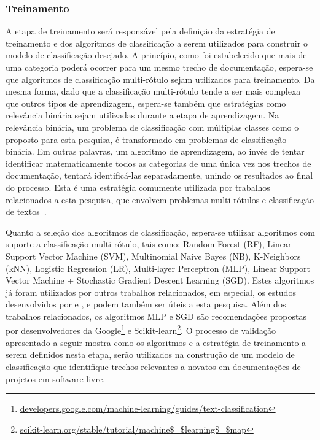 \subsubsection{Treinamento}
A etapa de treinamento será responsável pela definição da estratégia de treinamento e dos algoritmos de classificação a serem utilizados para construir o modelo de classificação desejado. A princípio, como foi estabelecido que mais de uma categoria poderá ocorrer para um mesmo trecho de documentação, espera-se que algoritmos de classificação multi-rótulo sejam utilizados para treinamento. Da mesma forma, dado que a classificação multi-rótulo tende a ser mais complexa que outros tipos de aprendizagem, espera-se também que estratégias como relevância binária sejam utilizadas durante a etapa de aprendizagem. Na relevância binária, um problema de classificação com múltiplas classes como o proposto para esta pesquisa, é transformado em problemas de classificação binária. Em outras palavras, um algoritmo de aprendizagem, ao invés de tentar identificar matematicamente todos as categorias de uma única vez nos trechos de documentação, tentará identificá-las separadamente, unindo os resultados ao final do processo. Esta é uma estratégia comumente utilizada por trabalhos relacionados a esta pesquisa, que envolvem problemas multi-rótulos e classificação de textos~\citep{panichella2015supporting}. 

Quanto a seleção dos algoritmos de classificação, espera-se utilizar algoritmos com suporte a classificação multi-rótulo, tais como: Random Forest (RF), Linear Support Vector Machine (SVM), Multinomial Naive Bayes (NB), K-Neighbors (kNN), Logistic Regression (LR), Multi-layer Perceptron (MLP), Linear Support Vector Machine + Stochastic Gradient Descent Learning (SGD). Estes algoritmos já foram utilizados por outros trabalhos relacionados, em especial, os estudos desenvolvidos por \citet{prana2019categorizing} e \citet{panichella2015how}, e podem também ser úteis a esta pesquisa. Além dos trabalhos relacionados, os algoritmos MLP e SGD são recomendações propostas por desenvolvedores da Google\footnote{\url{developers.google.com/machine-learning/guides/text-classification}} e Scikit-learn\footnote{\url{scikit-learn.org/stable/tutorial/machine$\_$learning$\_$map}}. O processo de validação apresentado a seguir mostra como os algoritmos e a estratégia de treinamento a serem definidos nesta etapa, serão utilizados na construção de um modelo de classificação que identifique trechos relevantes a novatos em documentações de projetos em software livre.


